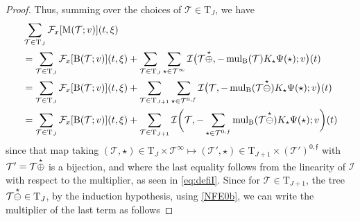 \documentclass[%
11pt,  reqno]{amsart}
\makeatletter
\newcommand{\5}{\textup{V}}
\newcommand{\noi}{\noindent}
\theoremstyle{remark}
\newcommand{\TT}{\mathcal{T}}
\newcommand{\Tr}{\mathrm{T}}
\newcommand{\Ft}{{\mathcal{F}}}
\newcommand{\ff}{\mathfrak{f}}
\DeclareMathOperator{\mulB}{mul_{\BB}}
\def\<#1>{\csname MH@symb@#1\endcsname}
\newcommand{\Ical}{\mathcal{I}}
\numberwithin{equation}{section}
\numberwithin{theorem}{section}
\newcommand{\MM}{\mathrm{M}}
\newcommand{\BB}{\mathrm{B}}
\makeatother
\begin{document}
\begin{proof}
\noi
Thus, summing over the choices of $\TT \in \Tr_{J}$, we have
\begin{align}
\label{mul2a}
\begin{split}
&
\sum_{\TT\in \Tr_{J}} \Ft_x [\MM(\TT; v) ](t,\xi) 
\\
&
= \sum_{\TT\in \Tr_{J}} \Ft_x[\BB(\TT; v) ](t, \xi)  
+
\sum_{\TT\in \Tr_{J}}
\sum_{\star\in\TT^\infty}
\Ical 
\big(\TT \overset{\star}{\oplus} \<1>,
-\mulB(\TT) K_\star \Psi(\star);  v \big) (t)
\\
&
=
 \sum_{\TT\in \Tr_{J}} \Ft_x[\BB(\TT; v) ](t, \xi)  
+ \sum_{\TT\in
\Tr_{J+1}}\sum_{\star\in\TT^{0,f}}
\Ical 
\big(\TT,
-\mulB(\TT \overset{\star}{\ominus} \<1>) K_\star \Psi(\star); v \big) (t)
\\
&
= 
 \sum_{\TT\in \Tr_{J}} \Ft_x[\BB(\TT; v) ](t, \xi)  
+
\sum_{\TT\in \Tr_{J+1}}
\Ical 
\bigg(\TT,
-\sum_{\star\in\TT^{0,f}}
\mulB(\TT \overset{\star}{\ominus}  \<1> ) K_\star \Psi(\star) ;
v
\bigg) (t)
\end{split}
\end{align}
since that map taking $(\TT, \star) \in \Tr_J \times \TT^\infty \mapsto (\TT', \star) \in \Tr_{J+1} \times (\TT')^{0,\ff}$ with $\TT' = \TT \overset{\star}{\oplus} \<1>$ is a bijection, and  
where the last equality follows from the linearity of $\Ical$ with respect to the multiplier, as seen in \eqref{eq:defiI}. Since for $\TT\in \Tr_{J+1}$, the tree $\TT \overset{\star}{\ominus} \<1>\in \Tr_{J}$, by the induction hypothesis, using \eqref{NFE0b}, we can write the multiplier of the last term as follows


\end{proof}
\end{document}

